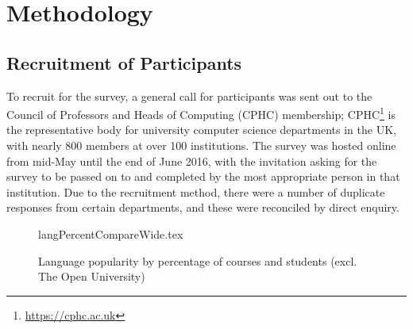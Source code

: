 \documentclass[english]{programming}
\begin{document}




\section{Methodology}\label{method}

\subsection{Recruitment of Participants}

To recruit for the survey, a general call for participants was sent
out to the Council of Professors and Heads of Computing (CPHC)
membership; CPHC\footnote{\url{https://cphc.ac.uk}} is the
representative body for university computer science departments in the
UK, with nearly 800 members at over 100 institutions. The survey was
hosted online from mid-May until the end of June 2016, with the
invitation asking for the survey to be passed on to and completed by
the most appropriate person in that institution. Due to the
recruitment method, there were a number of duplicate responses from
certain departments, and these were reconciled by direct enquiry.

\begin{figure}
\begin{center}
{langPercentCompareWide.tex}
\end{center}
\caption{Language popularity by percentage of courses and students
  (excl. The Open University)\label{fig:lang}}
\end{figure}
\end{document}
